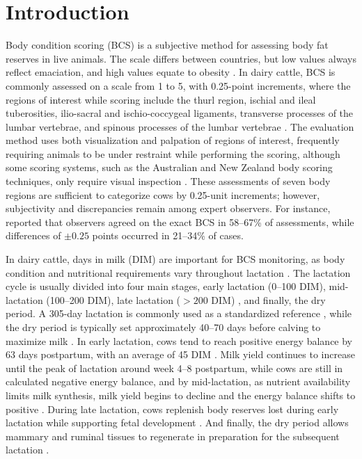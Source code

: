 \section{Introduction}

Body condition scoring (BCS) is a subjective method for assessing body fat reserves in live animals.
The scale differs between countries, but low values always reflect emaciation, and high values equate to obesity \citep{roche2009}.
In dairy cattle, BCS is commonly assessed on a scale from 1 to 5, with 0.25-point increments, where the regions of interest while scoring include the thurl region, ischial and ileal tuberosities, ilio-sacral and ischio-coccygeal ligaments, transverse processes of the lumbar vertebrae, and spinous processes of the lumbar vertebrae \citep{edmonson1989,wildman1982}.
The evaluation method uses both visualization and palpation of regions of interest, frequently requiring animals to be under restraint while performing the scoring, although some scoring systems, such as the Australian and New Zealand body scoring techniques, only require visual inspection \citep{edmonson1989}.
These assessments of seven body regions are sufficient to categorize cows by 0.25-unit increments; however, subjectivity and discrepancies remain among expert observers.
For instance, \citet{ferguson1994} reported that observers agreed on the exact BCS in 58--67\% of assessments, while differences of $\pm0.25$ points occurred in 21--34\% of cases.

In dairy cattle, days in milk (DIM) are important for BCS monitoring, as body condition and nutritional requirements vary throughout lactation \citep{roche2009}.
The lactation cycle is usually divided into four main stages, early lactation (0--100 DIM), mid-lactation (100--200 DIM), late lactation (${>}200$ DIM) \citep{vijayakumar2017}, and finally, the dry period.
A 305-day lactation is commonly used as a standardized reference \citep{nrc2021}, while the dry period is typically set approximately 40--70 days before calving to maximize milk \citep{jukna2024}.
In early lactation, cows tend to reach positive energy balance by 63 days postpartum, with an average of 45 DIM \citep{grummer2003}.
Milk yield continues to increase until the peak of lactation around week 4--8 postpartum, while cows are still in calculated negative energy balance, and by mid-lactation, as nutrient availability limits milk synthesis, milk yield begins to decline and the energy balance shifts to positive \citep{gross2011}.
During late lactation, cows replenish body reserves lost during early lactation while supporting fetal development \citep{nrc2021}.
And finally, the dry period allows mammary and ruminal tissues to regenerate in preparation for the subsequent lactation \citep{goselink2024}.

